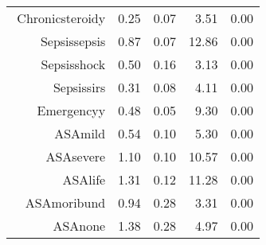 \begin{tabular}{rrrrr}
$$  Chronic\-steroid\-y & 0.25 & 0.07 & 3.51 & 0.00 \\ 
  Sepsis\-sepsis & 0.87 & 0.07 & 12.86 & 0.00 \\ 
  Sepsis\-shock & 0.50 & 0.16 & 3.13 & 0.00 \\ 
  Sepsis\-sirs & 0.31 & 0.08 & 4.11 & 0.00 \\ 
  Emergency\-y & 0.48 & 0.05 & 9.30 & 0.00 \\ 
  ASA\-mild & 0.54 & 0.10 & 5.30 & 0.00 \\ 
  ASA\-severe & 1.10 & 0.10 & 10.57 & 0.00 \\ 
  ASA\-life & 1.31 & 0.12 & 11.28 & 0.00 \\ 
  ASA\-moribund & 0.94 & 0.28 & 3.31 & 0.00 \\ 
  ASA\-none & 1.38 & 0.28 & 4.97 & 0.00 \\ 
   \hline
\end{tabular}

